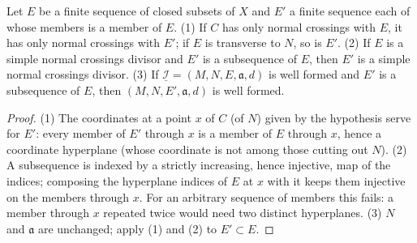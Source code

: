 \begin{lemma}
\label{bcalc:sub-divisor}
\mixedleanok
Let \(E\) be a finite sequence of closed subsets of \(X\) and \(E'\) a finite sequence each of whose members is a member of \(E\).
(1) If \(C\) has only normal crossings with \(E\), it has only normal crossings with \(E'\); if \(E\) is transverse to \(N\), so is \(E'\).
(2) If \(E\) is a simple normal crossings divisor and \(E'\) is a subsequence of \(E\), then \(E'\) is a simple normal crossings divisor.
(3) If \(\underline{\mathcal I}=(M,N,E,\mathfrak a,d)\) is well formed and \(E'\) is a subsequence of \(E\), then \((M,N,E',\mathfrak a,d)\) is well formed.
\end{lemma}
\begin{proof}
\mixedleanok
(1) The coordinates at a point \(x\) of \(C\) (of \(N\)) given by the hypothesis serve for \(E'\): every member of \(E'\) through \(x\) is a member of
\(E\) through \(x\), hence a coordinate hyperplane (whose coordinate is not among those cutting out \(N\)). (2) A subsequence is indexed by a strictly
increasing, hence injective, map of the indices; composing the hyperplane indices of \(E\) at \(x\) with it keeps them injective on the members through
\(x\). For an arbitrary sequence of members this fails: a member through \(x\) repeated twice would need two distinct hyperplanes. (3) \(N\) and
\(\mathfrak a\) are unchanged; apply (1) and (2) to \(E'\subset E\).
\end{proof}

